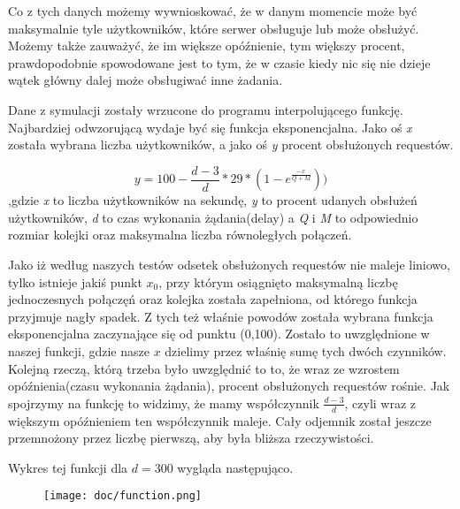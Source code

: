 \documentclass{article}
\begin{document}
    Co z tych danych możemy wywnioskować, że w danym momencie może być maksymalnie tyle użytkowników, które serwer obsługuje lub może obsłużyć.
    Możemy także zauważyć, że im większe opóźnienie, tym większy procent, prawdopodobnie spowodowane jest to tym, że
    w czasie kiedy nic się nie dzieje wątek główny dalej może obsługiwać inne żadania.

    Dane z symulacji zostały wrzucone do programu interpolującego funkcję.
    Najbardziej odwzorującą wydaje być się funkcja eksponencjalna.\newline
    Jako oś \emph{x} została wybrana liczba użytkowników, a jako oś \emph{y} procent obsłużonych requestów.

    \begin{equation*}
        y = 100 - \frac{d-3}{d}*29*(1-e^\frac{-x}{Q+M}))
    \end{equation*},gdzie \emph{x} to liczba użytkowników na sekundę,\newline
    \emph{y} to procent udanych obsłużeń użytkowników, \newline
    \emph{d} to czas wykonania żądania(delay) \newline
    a \emph{Q} i \emph{M} to odpowiednio rozmiar kolejki oraz maksymalna liczba równoległych połączeń.

    Jako iż według naszych testów odsetek obsłużonych requestów nie maleje liniowo, tylko istnieje jakiś punkt \textbf{$x_0$}, \newline
    przy którym osiągnięto maksymalną liczbę jednoczesnych połączęń oraz kolejka została zapełniona, od którego funkcja
    przyjmuje nagły spadek. \newline Z tych też właśnie powodów została wybrana funkcja eksponencjalna zaczynające się
    od punktu (0,100).
    Zostało to uwzględnione w naszej funkcji, gdzie nasze $x$ dzielimy przez właśnię sumę tych dwóch czynników. \newline
    Kolejną rzeczą, którą trzeba było uwzględnić to to, że wraz ze wzrostem opóźnienia(czasu wykonania żądania),
    procent obsłużonych requestów rośnie. Jak spojrzymy na funkcję to widzimy, że mamy współczynnik $\frac{d-3}{d}$, czyli
    wraz z większym opóźnieniem ten współczynnik maleje. Cały odjemnik został jeszcze przemnożony przez liczbę pierwszą, aby
    była bliższa rzeczywistości.\newline


    Wykres tej funkcji dla $d=300$ wygląda następująco.

    \begin{figure}[H]
        \centering
        \texttt{[image: doc/function.png]}
        \label{fig:figure}
    \end{figure}
\end{document}
